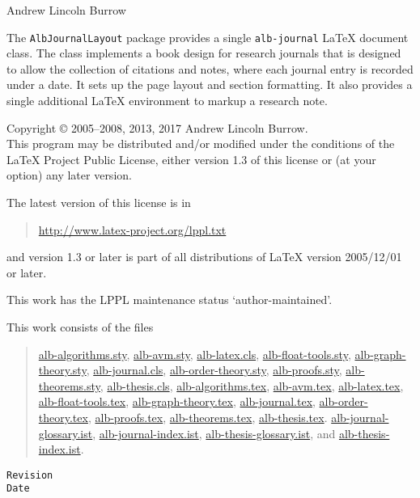 \documentclass[11pt,a4paper,oneside,titlepage]{alb-latex}
\begin{document}



\begin{albTitlePage}


  Andrew Lincoln Burrow


  The \texttt{AlbJournalLayout} package provides a single
  \texttt{alb-journal} \LaTeX{} document class.  The class implements a
  book design for research journals that is designed to allow the
  collection of citations and notes, where each journal entry is
  recorded under a date.  It sets up the page layout and section
  formatting.  It also provides a single additional \LaTeX{} environment
  to markup a research note.



  Copyright \copyright{} 2005--2008, 2013, 2017 Andrew Lincoln Burrow.\\
  This program may be distributed and/or modified under the conditions
  of the \LaTeX{} Project Public License, either version 1.3 of this
  license or (at your option) any later version.

  \medskip{}

  The latest version of this license is in
  \begin{quote}
    \url{http://www.latex-project.org/lppl.txt}
  \end{quote}
  and version 1.3 or later is part of all distributions of LaTeX version
  2005/12/01 or later.

  \medskip{}

  This work has the LPPL maintenance status `author-maintained'.

  \medskip{}

  This work consists of the files
  \begin{quote}
    \begin{flushleft}
      \url{alb-algorithms.sty}, \url{alb-avm.sty}, \url{alb-latex.cls},
      \url{alb-float-tools.sty}, \url{alb-graph-theory.sty},
      \url{alb-journal.cls}, \url{alb-order-theory.sty},
      \url{alb-proofs.sty}, \url{alb-theorems.sty},
      \url{alb-thesis.cls}, \url{alb-algorithms.tex}, \url{alb-avm.tex},
      \url{alb-latex.tex}, \url{alb-float-tools.tex},
      \url{alb-graph-theory.tex}, \url{alb-journal.tex},
      \url{alb-order-theory.tex}, \url{alb-proofs.tex},
      \url{alb-theorems.tex}, \url{alb-thesis.tex}.
      \url{alb-journal-glossary.ist}, \url{alb-journal-index.ist},
      \url{alb-thesis-glossary.ist}, and \url{alb-thesis-index.ist}.
    \end{flushleft}
  \end{quote}



  \verb$Revision$\\
  \verb$Date$

\end{albTitlePage}
\end{document}
